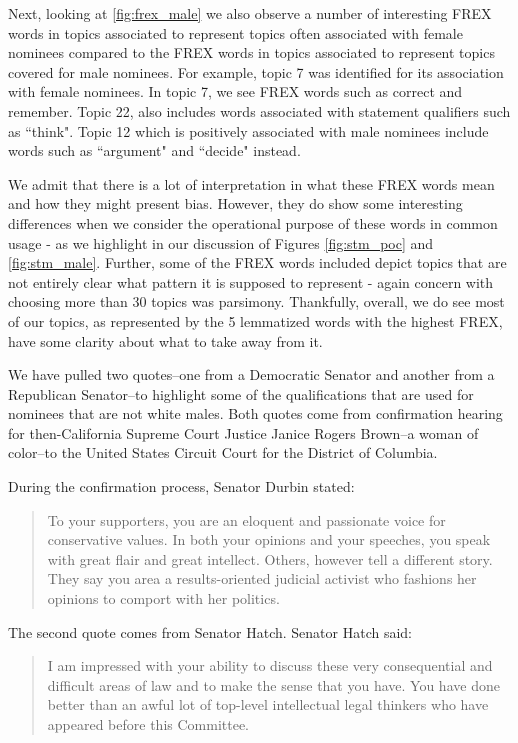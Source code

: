 \documentclass [12pt]{article}
\begin{document}
Next, looking at \ref{fig:frex_male} we also observe a number of interesting FREX words in topics associated to represent topics often associated with female nominees compared to the FREX words in topics associated to represent topics covered for male nominees. For example, topic 7 was identified for its association with female nominees. In topic 7, we see FREX words such as correct and remember. Topic 22, also includes words associated with statement qualifiers such as ``think". Topic 12 which is positively associated with male nominees include words such as ``argument" and ``decide" instead.

We admit that there is a lot of interpretation in what these FREX words mean and how they might present bias. However, they do show some interesting differences when we consider the operational purpose of these words in common usage - as we highlight in our discussion of Figures \ref{fig:stm_poc} and \ref{fig:stm_male}. Further, some of the FREX words included depict topics that are not entirely clear what pattern it is supposed to represent - again concern with choosing more than 30 topics was parsimony. Thankfully, overall, we do see most of our topics, as represented by the 5 lemmatized words with the highest FREX, have some clarity about what to take away from it.

We have pulled two quotes--one from a Democratic Senator and another from a Republican Senator--to highlight some of the qualifications that are used for nominees that are not white males. Both quotes come from confirmation hearing for then-California Supreme Court Justice Janice Rogers Brown--a woman of color--to the United States Circuit Court for the District of Columbia. 

During the confirmation process, Senator Durbin stated:
\begin{quote} To your supporters, you are an eloquent and passionate voice for conservative values. In both your opinions and your speeches, you speak with great flair and great intellect. Others, however tell a different story. They say you area a results-oriented judicial activist who fashions her opinions to comport with her politics. \end{quote}

The second quote comes from Senator Hatch. Senator Hatch said:
\begin{quote} I am impressed with your ability to discuss these very consequential and difficult areas of law and to make the sense that you have. You have done better than an awful lot of top-level intellectual legal thinkers who have appeared before this Committee. \end{quote} 
\end{document}
